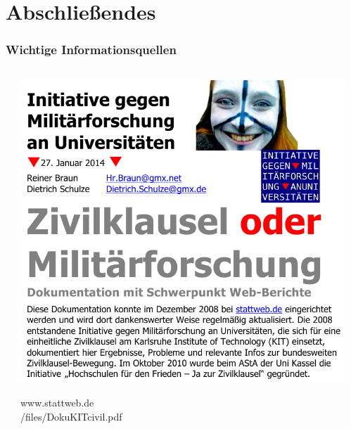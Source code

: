 \documentclass[presentation]{beamer}
\begin{document}
\section{Abschließendes}
\label{sec-5}
\begin{frame}
\frametitle{Wichtige Informationsquellen}
\label{sec-5-1}
\begin{columns}[t] %
\label{sec-5-1-1}
\begin{column}{0.25\textwidth}
\label{sec-5-1-1-1}

\includegraphics[width=\textwidth]{./dokukit.png}

\tiny www.stattweb.de\\
\tiny /files/DokuKITcivil.pdf
\end{column}
\begin{column}{0.25\textwidth}
\label{sec-5-1-1-2}


\end{column}
\end{columns}
\end{frame}
\end{document}
